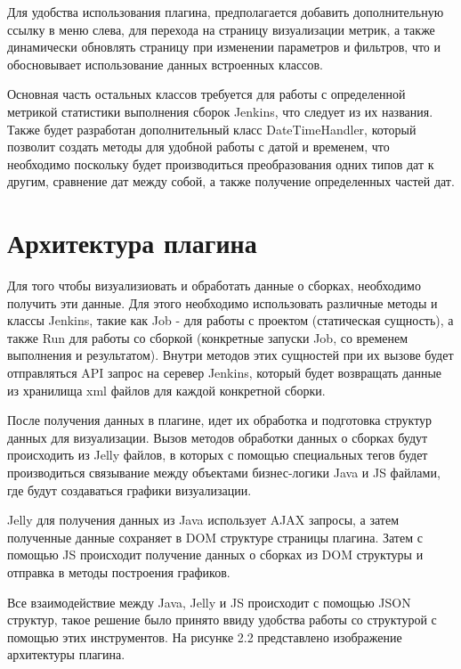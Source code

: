 Для удобства использования плагина, предполагается добавить дополнительную ссылку в меню слева, для перехода на страницу визуализации метрик, а также динамически обновлять страницу при изменении параметров и фильтров, что и обосновывает использование данных встроенных классов.

Основная часть остальных классов требуется для работы с определенной метрикой статистики выполнения сборок Jenkins, что следует из их названия. Также будет разработан дополнительный класс DateTimeHandler, который позволит создать методы для удобной работы с датой и временем, что необходимо поскольку будет производиться преобразования одних типов дат к другим, сравнение дат между собой, а также получение определенных частей дат.

\section{Архитектура плагина} \label{ch1:sec3}

Для того чтобы визуализиовать и обработать данные о сборках, необходимо получить эти данные. Для этого необходимо использовать различные методы и классы Jenkins, такие как Job - для работы с проектом (статическая сущность), а также Run для работы со сборкой (конкретные запуски Job, со временем выполнения и результатом). Внутри методов этих сущностей при их вызове будет отправляться API запрос на серевер Jenkins, который будет возвращать данные из хранилища xml файлов для каждой конкретной сборки.

После получения данных в плагине, идет их обработка и подготовка структур данных для визуализации. Вызов методов обработки данных о сборках будут происходить из Jelly файлов, в которых с помощью специальных тегов будет производиться связывание между объектами бизнес-логики Java и JS файлами, где будут создаваться графики визуализации.

Jelly для получения данных из Java использует AJAX запросы, а затем полученные данные сохраняет в DOM структуре страницы плагина. Затем с помощью JS происходит получение данных о сборках из DOM структуры и отправка в методы построения графиков.

Все взаимодействие между Java, Jelly и JS происходит с помощью JSON структур, такое решение было принято ввиду удобства работы со структурой с помощью этих инструментов. На рисунке 2.2 представлено изображение архитектуры плагина.

